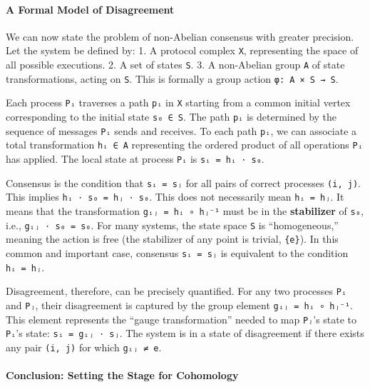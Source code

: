 \documentclass[
]{article}
\begin{document}
\paragraph{A Formal Model of
Disagreement}\label{a-formal-model-of-disagreement}

We can now state the problem of non-Abelian consensus with greater
precision. Let the system be defined by: 1. A protocol complex
\texttt{X}, representing the space of all possible executions. 2. A set
of states \texttt{S}. 3. A non-Abelian group \texttt{A} of state
transformations, acting on \texttt{S}. This is formally a group action
\texttt{φ:\ A\ ×\ S\ →\ S}.

Each process \texttt{Pᵢ} traverses a path \texttt{pᵢ} in \texttt{X}
starting from a common initial vertex corresponding to the initial state
\texttt{s₀\ ∈\ S}. The path \texttt{pᵢ} is determined by the sequence of
messages \texttt{Pᵢ} sends and receives. To each path \texttt{pᵢ}, we
can associate a total transformation \texttt{hᵢ\ ∈\ A} representing the
ordered product of all operations \texttt{Pᵢ} has applied. The local
state at process \texttt{Pᵢ} is \texttt{sᵢ\ =\ hᵢ\ ⋅\ s₀}.

Consensus is the condition that \texttt{sᵢ\ =\ sⱼ} for all pairs of
correct processes \texttt{(i,\ j)}. This implies
\texttt{hᵢ\ ⋅\ s₀\ =\ hⱼ\ ⋅\ s₀}. This does not necessarily mean
\texttt{hᵢ\ =\ hⱼ}. It means that the transformation
\texttt{gᵢⱼ\ =\ hᵢ\ ∘\ hⱼ⁻¹} must be in the \textbf{stabilizer} of
\texttt{s₀}, i.e., \texttt{gᵢⱼ\ ⋅\ s₀\ =\ s₀}. For many systems, the
state space \texttt{S} is ``homogeneous,'' meaning the action is free
(the stabilizer of any point is trivial, \texttt{\{e\}}). In this common
and important case, consensus \texttt{sᵢ\ =\ sⱼ} is equivalent to the
condition \texttt{hᵢ\ =\ hⱼ}.

Disagreement, therefore, can be precisely quantified. For any two
processes \texttt{Pᵢ} and \texttt{Pⱼ}, their disagreement is captured by
the group element \texttt{gᵢⱼ\ =\ hᵢ\ ∘\ hⱼ⁻¹}. This element represents
the ``gauge transformation'' needed to map \texttt{Pⱼ}'s state to
\texttt{Pᵢ}'s state: \texttt{sᵢ\ =\ gᵢⱼ\ ⋅\ sⱼ}. The system is in a
state of disagreement if there exists any pair \texttt{(i,\ j)} for
which \texttt{gᵢⱼ\ ≠\ e}.

\paragraph{Conclusion: Setting the Stage for
Cohomology}\label{conclusion-setting-the-stage-for-cohomology}
\end{document}
